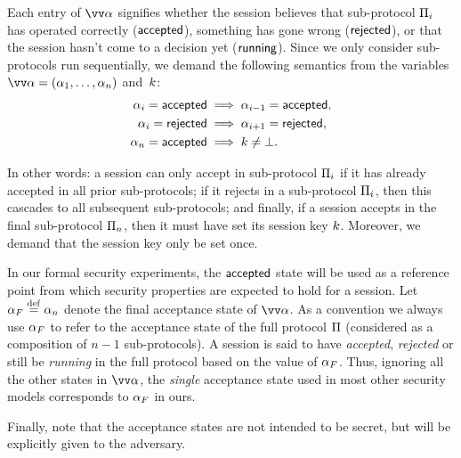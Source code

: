 Each entry of $\vrunstate$ signifies whether the session believes that sub-protocol $\mathrm{\Pi}_i$ has operated correctly
($\mathsf{accepted}$),
something has gone wrong ($\mathsf{rejected}$),
or that the session hasn't come to a decision yet ($\mathsf{running}$).
Since we only consider sub-protocols run sequentially,
we demand the following semantics from the variables $\vrunstate = (\runstate_1, \dotsc, \runstate_n)$ and~$k$:  
\begin{align}
	\alpha_i = \mathsf{accepted} &\implies \alpha_{i-1} = \mathsf{accepted}, \\
	\alpha_i = \mathsf{rejected} &\implies \alpha_{i+1} = \mathsf{rejected}, \label{eq:runstate:reject_consistency} \\
	\alpha_n = \mathsf{accepted} &\implies k \neq \bot . \label{eq:runstate:accepted_implies_k} 
\end{align}


In other words:
a session can only accept in sub-protocol $\mathrm{\Pi}_i$ if it has already accepted in all prior sub-protocols;
if it rejects in a sub-protocol $\mathrm{\Pi}_i$, then this cascades to all subsequent sub-protocols;
and finally,
if a session accepts in the final sub-protocol $\mathrm{\Pi}_n$,
then it must have set its session key $k$.
Moreover,
we demand that the session key only be set once.


In our formal security experiments,
the $\mathsf{accepted}$ state will be used as a reference point from which security properties are expected to hold for a session.
Let $\alpha_F \overset{\mathrm{def}}{=} \alpha_n$ denote the final acceptance state of $\vrunstate$.
As a convention we always use $\alpha_F$ to refer to the acceptance state of the full protocol $\mathrm{\Pi}$ (considered as a composition of $n-1$ sub-protocols).
A session is said to have \emph{accepted}, \emph{rejected}
or still be \emph{running} in the full protocol based on the value of $\alpha_F$.
Thus,
ignoring all the other states in $\vrunstate$,
the \emph{single} acceptance state used in most other security models corresponds to $\alpha_F$ in ours.

Finally,
note that the acceptance states are not intended to be secret,
but will be explicitly given to the adversary.




